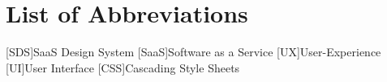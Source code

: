 \section*{List of Abbreviations}
\begin{acronym}
    [SDS]{SaaS Design System}
    [SaaS]{Software as a Service}
    [UX]{User-Experience}
    [UI]{User Interface}
    [CSS]{Cascading Style Sheets}

\end{acronym}